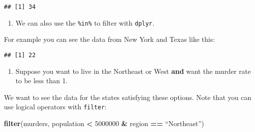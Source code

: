\documentclass[]{article}
\newenvironment{Shaded}{\begin{snugshade}}{\end{snugshade}}
\newcommand{\CommentTok}[1]{\textcolor[rgb]{0.56,0.35,0.01}{\textit{#1}}}
\newcommand{\DecValTok}[1]{\textcolor[rgb]{0.00,0.00,0.81}{#1}}
\newcommand{\KeywordTok}[1]{\textcolor[rgb]{0.13,0.29,0.53}{\textbf{#1}}}
\newcommand{\NormalTok}[1]{#1}
\newcommand{\OperatorTok}[1]{\textcolor[rgb]{0.81,0.36,0.00}{\textbf{#1}}}
\newcommand{\StringTok}[1]{\textcolor[rgb]{0.31,0.60,0.02}{#1}}
\providecommand{\tightlist}{%
  \setlength{\itemsep}{0pt}\setlength{\parskip}{0pt}}
\begin{document}
\begin{verbatim}
## [1] 34
\end{verbatim}

\begin{enumerate}
\def\labelenumi{\arabic{enumi}.}
\setcounter{enumi}{5}
\tightlist
\item
  We can also use the \texttt{\%in\%} to filter with \texttt{dplyr}.
\end{enumerate}

For example you can see the data from New York and Texas like this:

\begin{Shaded}
\end{Shaded}

\begin{Shaded}
\end{Shaded}

\begin{verbatim}
## [1] 22
\end{verbatim}

\begin{enumerate}
\def\labelenumi{\arabic{enumi}.}
\setcounter{enumi}{6}
\tightlist
\item
  Suppose you want to live in the Northeast or West \textbf{and} want
  the murder rate to be less than 1.
\end{enumerate}

We want to see the data for the states satisfying these options. Note
that you can use logical operators with \texttt{filter}:

\begin{Shaded}
\begin{Highlighting}[]
\KeywordTok{filter}\NormalTok{(murders, population }\OperatorTok{<}\StringTok{ }\DecValTok{5000000} \OperatorTok{&}\StringTok{ }\NormalTok{region }\OperatorTok{==}\StringTok{ }\NormalTok{“Northeast”)}
\end{Highlighting}
\end{Shaded}
\end{document}
